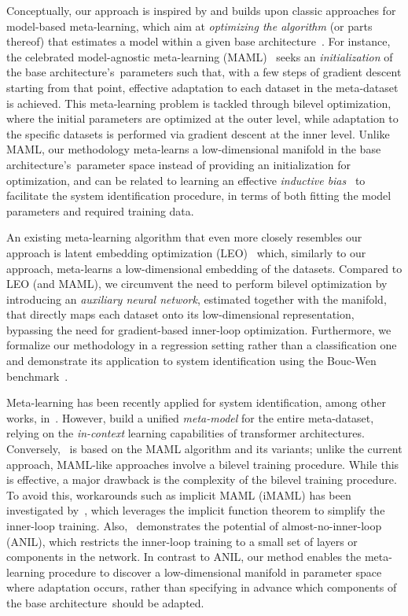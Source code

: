 \documentclass{article}
\newcommand{\base}{{base architecture}}
\begin{document}
Conceptually, our approach is inspired by and builds upon classic approaches for {model-based} meta-learning, which aim at \emph{optimizing the algorithm} (or parts thereof) that estimates a model within a given \base~\cite{hospedales2021meta}. For instance, the celebrated model-agnostic meta-learning (MAML)~\cite{finn2017model} seeks an \emph{initialization} of the \base's\ parameters such that, with a few steps of gradient descent starting from that point, effective adaptation to each dataset in the meta-dataset is achieved. This meta-learning problem is tackled through bilevel optimization, where the initial parameters are optimized at the outer level, while adaptation to the specific datasets is performed via gradient descent at the inner level.
Unlike MAML, our methodology meta-learns a low-dimensional manifold in the \base's\ parameter space instead of providing an initialization for optimization, and can be related to learning an effective {\it inductive bias}~\cite{goyal2022inductive} to facilitate the system identification procedure, in terms of both fitting the model parameters and required training data.

An existing meta-learning algorithm that even more closely resembles our approach is latent embedding optimization (LEO)~\cite{rusu2018meta} which, similarly to our approach, meta-learns a low-dimensional embedding of the datasets. Compared to LEO (and MAML), we circumvent the need to perform bilevel optimization by introducing an \emph{auxiliary neural network}, estimated together with the manifold, that directly maps each dataset onto its low-dimensional representation, bypassing the need for gradient-based inner-loop optimization. 
Furthermore, we formalize our methodology in a regression setting rather than a classification one and demonstrate its application to system identification using the Bouc-Wen benchmark~\cite{noel2016hysteretic}.

Meta-learning has been recently applied for system identification, among other works, in~\cite{du2023can,forgione2023system,chakrabarty2025meta}. However, \cite{du2023can,forgione2023system} build a unified \emph{meta-model} for the entire meta-dataset, relying on the \emph{in-context} learning capabilities of transformer architectures. Conversely,~\cite{chakrabarty2025meta} is based on the MAML algorithm and its variants; unlike the current approach, MAML-like approaches involve a bilevel training procedure. While this is effective, a major drawback is the complexity of the bilevel training procedure. To avoid this, workarounds such as implicit MAML (iMAML) has been investigated by~\cite{yan2024mpc}, which leverages the implicit function theorem to simplify the inner-loop training. Also,~\cite{chakrabarty2024physics} demonstrates the potential of almost-no-inner-loop (ANIL), which restricts the inner-loop training to a small set of layers or components in the network. 
In contrast to ANIL, our method enables the meta-learning procedure to discover a low-dimensional manifold in parameter space where adaptation occurs, rather than specifying in advance which components of the \base\ should be adapted.
\end{document}
